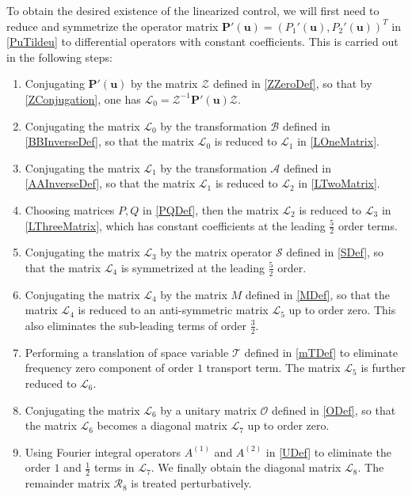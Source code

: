 \documentclass[12pt]{amsart}
\theoremstyle{remark}
\theoremstyle{definition}
\numberwithin{equation}{section}
\newcommand{\f}{\frac}
\newcommand{\mA}{\mathcal{A}}
\newcommand{\mB}{\mathcal{B}}
\newcommand{\mL}{\mathcal{L}}
\newcommand{\mS}{\mathcal{S}}
\newcommand{\mR}{\mathcal{R}}
\newcommand{\mZ}{\mathcal{Z}}
\begin{document}
To obtain the desired existence of the linearized control, we will first need to reduce and symmetrize the operator matrix $\mathbf{P}'(\mathbf{u}) = (P_1'(\mathbf{u}), P_2'(\mathbf{u}))^T$ in \eqref{PuTildeu} to differential operators with constant coefficients.
This is carried out in the following steps:
\begin{enumerate}
\item Conjugating $\mathbf{P}'(\mathbf{u})$ by the matrix $\mZ$ defined in \eqref{ZZeroDef}, so that by \eqref{ZConjugation}, one has $\mL_0 = \mZ^{-1} \mathbf{P}'(\mathbf{u}) \mZ $.

\item  Conjugating the matrix $\mL_0$ by the transformation $\mB$ defined in \eqref{BBInverseDef}, so that the matrix $\mL_0$ is reduced to $\mL_1$ in \eqref{LOneMatrix}.

\item  Conjugating the matrix $\mL_1$ by the transformation $\mA$ defined in \eqref{AAInverseDef}, so that the matrix $\mL_1$ is reduced to $\mL_2$ in \eqref{LTwoMatrix}.

\item Choosing matrices $P,Q$ in \eqref{PQDef}, then the matrix $\mL_2$ is reduced to $\mL_3$ in \eqref{LThreeMatrix}, which has constant coefficients at the leading $\f{5}{2}$ order terms.

\item Conjugating the matrix $\mL_3$ by the matrix operator $\mS$ defined in \eqref{SDef}, so that the matrix $\mL_4$ is symmetrized at the leading $\f{5}{2}$ order.

\item Conjugating the matrix $\mL_4$ by the matrix $M$ defined in \eqref{MDef}, so that the matrix $\mL_4$ is reduced to an anti-symmetric matrix $\mL_5$ up to order zero.
This also eliminates the sub-leading terms of order $\f32$.

\item Performing a translation of space variable $\mathcal{T}$ defined in \eqref{mTDef} to eliminate frequency zero component of order $1$ transport term.
The matrix $\mL_5$ is further reduced to $\mL_6$.

\item Conjugating the matrix $\mL_6$ by a unitary matrix $\mathcal{O}$ defined in \eqref{ODef}, so that the matrix $\mL_6$ becomes a diagonal matrix $\mL_7$ up to order zero.

\item  Using Fourier integral operators $A^{(1)}$ and $A^{(2)}$ in \eqref{UDef} to eliminate the order $1$ and $\f12$ terms in $\mL_7$.
We finally obtain the diagonal matrix $\mL_8$.
The remainder matrix $\mR_8$ is treated  perturbatively.
\end{enumerate}
\end{document}
